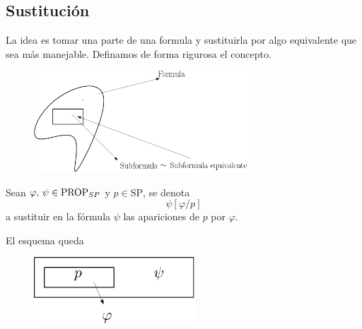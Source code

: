 \subsection{Sustitución}
La idea es tomar una parte de una formula y sustituirla por algo equivalente que sea más manejable. Definamos de forma rigurosa el concepto. 

\begin{figure}[h]
\centering
\includegraphics[width=8cm]{susti}
\end{figure}

\begin{definition} Sean $\varphi, \, \psi \in \mbox{PROP}_{SP}$ y $p \in \mbox{SP}$, se denota
\[ \psi[\varphi/p] \]
a sustituir en la fórmula $\psi$ las apariciones de $p$ por $\varphi$.
\end{definition}

El esquema queda

\begin{figure}[h]
\centering
\includegraphics[width=6cm]{esq}
\end{figure}

